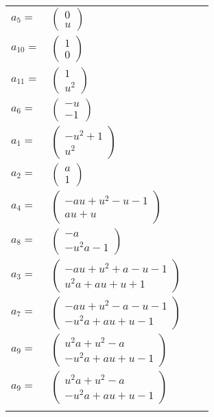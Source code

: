 \documentclass[1p]{elsarticle_modified}
\theoremstyle{definition}
\begin{document}
\begin{tabular}{m{7pt} m{180pt} m{7pt} m{180pt} }
\flushright $a_{5}=$&$\begin{pmatrix}0\\u\end{pmatrix}$ \\
\flushright $a_{10}=$&$\begin{pmatrix}1\\0\end{pmatrix}$ \\
\flushright $a_{11}=$&$\begin{pmatrix}1\\u^2\end{pmatrix}$ \\
\flushright $a_{6}=$&$\begin{pmatrix}- u\\-1\end{pmatrix}$ \\
\flushright $a_{1}=$&$\begin{pmatrix}- u^2+1\\u^2\end{pmatrix}$ \\
\flushright $a_{2}=$&$\begin{pmatrix}a\\1\end{pmatrix}$ \\
\flushright $a_{4}=$&$\begin{pmatrix}- a u+u^2- u-1\\a u+u\end{pmatrix}$ \\
\flushright $a_{8}=$&$\begin{pmatrix}- a\\- u^2 a-1\end{pmatrix}$ \\
\flushright $a_{3}=$&$\begin{pmatrix}- a u+u^2+a- u-1\\u^2 a+a u+u+1\end{pmatrix}$ \\
\flushright $a_{7}=$&$\begin{pmatrix}- a u+u^2- a- u-1\\- u^2 a+a u+u-1\end{pmatrix}$ \\
\flushright $a_{9}=$&$\begin{pmatrix}u^2 a+u^2- a\\- u^2 a+a u+u-1\end{pmatrix}$\\ \flushright $a_{9}=$&$\begin{pmatrix}u^2 a+u^2- a\\- u^2 a+a u+u-1\end{pmatrix}$\\&\end{tabular}
\end{document}
